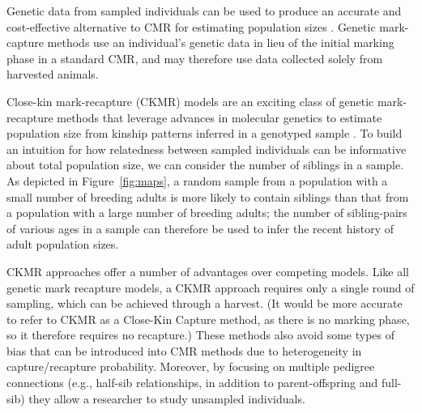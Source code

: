 \documentclass[11pt]{article}
\begin{document}
Genetic data from sampled individuals can be used to produce
an accurate and cost-effective alternative to CMR 
for estimating population sizes \citep{Skaug2001,Hettiarachchige2018}. 
Genetic mark-capture methods use 
an individual's genetic data in lieu of
the initial marking phase in a standard CMR,  
and may therefore use 
data collected solely from harvested animals.

Close-kin mark-recapture (CKMR) models 
are an exciting class of genetic mark-recapture methods 
that leverage advances in molecular genetics 
to estimate population size 
from kinship patterns inferred in a genotyped sample 
\citep{bravington2016closekin,ruzzante2019validation}.
To build an intuition for how relatedness 
between sampled individuals can be informative 
about total population size, 
we can consider the number of siblings in a sample.
As depicted in Figure~\ref{fig:maps},
a random sample from a population 
with a small number of breeding adults 
is more likely to contain siblings than that 
from a population with a large number of breeding adults; 
the number of sibling-pairs of various ages in a sample can 
therefore be used to infer the recent history of adult population sizes.

CKMR approaches offer a number of advantages 
over competing models. 
Like all genetic mark recapture models, 
a CKMR approach requires only a single round of sampling, 
which can be achieved through a harvest.
(It would be more accurate to refer to CKMR as 
a Close-Kin Capture method, 
as there is no marking phase, 
so it therefore requires no recapture.)
These methods also avoid some types of bias 
that can be introduced into CMR methods due to 
heterogeneity in capture/recapture probability.
Moreover, by focusing on multiple pedigree connections 
(e.g., half-sib relationships, 
in addition to parent-offspring and full-sib) 
they allow a researcher to study unsampled individuals.
\end{document}
